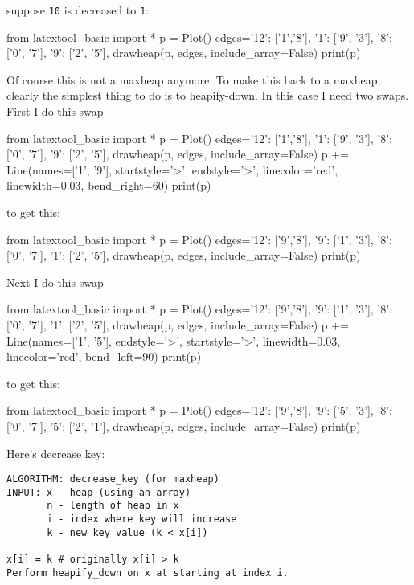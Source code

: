 suppose \texttt{10} is decreased to \texttt{1}:

\begin{python}
from latextool_basic import *
p = Plot()
edges={'12': ['1','8'],
       '1': ['9', '3'],
       '8': ['0', '7'],
       '9': ['2', '5'],
     }
drawheap(p, edges, include_array=False)
print(p)
\end{python}

Of course this is not a maxheap anymore.
To make this back to a maxheap, clearly the simplest thing to do is
to heapify-down.
In this case I need two swaps.
First I do this swap

\begin{python}
from latextool_basic import *
p = Plot()
edges={'12': ['1','8'],
       '1': ['9', '3'],
       '8': ['0', '7'],
       '9': ['2', '5'],
     }
drawheap(p, edges, include_array=False)
p += Line(names=['1', '9'], startstyle='>', endstyle='>', linecolor='red', linewidth=0.03, bend_right=60)     
print(p)
\end{python}

to get this:

\begin{python}
from latextool_basic import *
p = Plot()
edges={'12': ['9','8'],
       '9': ['1', '3'],
       '8': ['0', '7'],
       '1': ['2', '5'],
     }
drawheap(p, edges, include_array=False)
print(p)
\end{python}

Next I do this swap 

\begin{python}
from latextool_basic import *
p = Plot()
edges={'12': ['9','8'],
       '9': ['1', '3'],
       '8': ['0', '7'],
       '1': ['2', '5'],
     }
drawheap(p, edges, include_array=False)
p += Line(names=['1', '5'], endstyle='>', startstyle='>', linewidth=0.03, linecolor='red', bend_left=90)     
print(p)
\end{python}

to get this:

\begin{python}
from latextool_basic import *
p = Plot()
edges={'12': ['9','8'],
       '9': ['5', '3'],
       '8': ['0', '7'],
       '5': ['2', '1'],
     }
drawheap(p, edges, include_array=False)
print(p)
\end{python}

Here's decrease key:

\begin{Verbatim}[frame=single]
ALGORITHM: decrease_key (for maxheap)
INPUT: x - heap (using an array)
       n - length of heap in x
       i - index where key will increase
       k - new key value (k < x[i])

x[i] = k # originally x[i] > k
Perform heapify_down on x at starting at index i.
\end{Verbatim}


